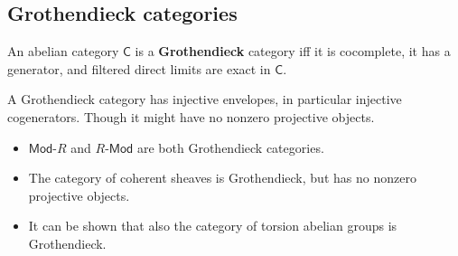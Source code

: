 \subsection{Grothendieck categories}
\begin{defn}
	An abelian category $\mathsf{C}$ is a \textbf{Grothendieck} category iff
	it is cocomplete, it has a generator, and filtered direct limits are exact in $\mathsf{C}$.
\end{defn}

\begin{rem}
	A Grothendieck category has injective envelopes, in particular injective cogenerators.
	Though it might have no nonzero projective objects.
\end{rem}

\begin{ex}\leavevmode\vspace{-.2\baselineskip}
	\begin{itemize}
		\item $\mathsf{Mod}\text{-}R$ and $R\text{-}\mathsf{Mod}$ are both Grothendieck categories.
		\item The category of coherent sheaves is Grothendieck, but has no nonzero projective objects.
		\item It can be shown that also the category of torsion abelian groups is Grothendieck.
	\end{itemize}
\end{ex} 
